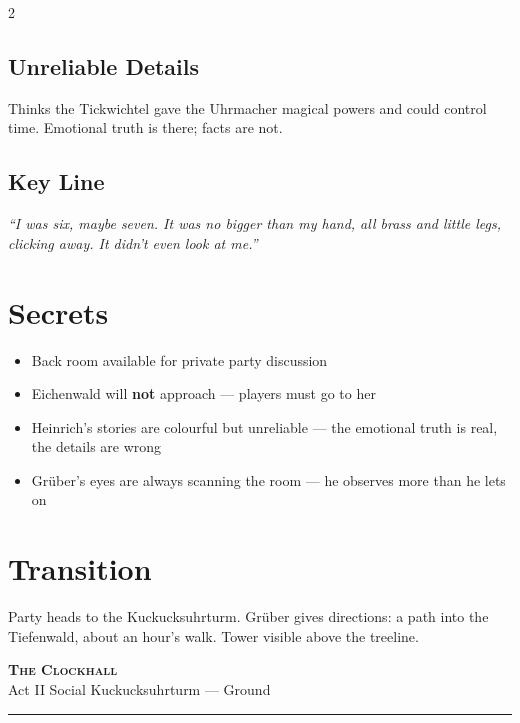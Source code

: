 \documentclass[10pt,letterpaper]{article}
\newcommand{\sceneheader}[4]{%
  \fancyhead[L]{\small\textcolor{accent}{\scshape #1}}%
  \fancyhead[R]{\small\textcolor{accent}{#2 \quad \textbullet \quad #3}}%
  \begin{center}
  {\LARGE\bfseries\scshape\textcolor{accent}{#1}}\\[2pt]
  {\small #2 \quad \textbullet \quad #3 \quad \textbullet \quad #4}\\[2pt]
  \textcolor{rulecol}{\rule{0.5\textwidth}{0.8pt}}
  \end{center}
  \vspace{-4pt}
}
\begin{document}
\begin{multicols}{2}
\subsection*{Unreliable Details}
Thinks the Tickwichtel gave the Uhrmacher magical powers and could control time. Emotional truth is there; facts are not.
\subsection*{Key Line}
\textit{``I was six, maybe seven. It was no bigger than my hand, all brass and little legs, clicking away. It didn't even look at me.''}

\section*{Secrets}
\begin{itemize}
\item Back room available for private party discussion
\item Eichenwald will \textbf{not} approach --- players must go to her
\item Heinrich's stories are colourful but unreliable --- the emotional truth is real, the details are wrong
\item Grüber's eyes are always scanning the room --- he observes more than he lets on
\end{itemize}

\section*{Transition}
Party heads to the Kuckucksuhrturm. Grüber gives directions: a path into the Tiefenwald, about an hour's walk. Tower visible above the treeline.

\end{multicols}

\newpage


\label{sec:clockhall}\sceneheader{The Clockhall}{Act II}{Social}{Kuckucksuhrturm --- Ground}
\end{document}
